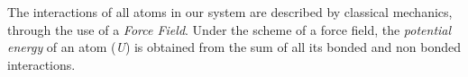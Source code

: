 \documentclass[a4paper,12pt]{article}
\begin{document}
The interactions of all atoms in our system are described by
classical mechanics, through the use of a {\it Force Field}. Under
the scheme of a force field, the {\it potential energy} of an atom
({\it U}) is obtained from the sum of all its bonded and non
bonded interactions. \newline
\end{document}
